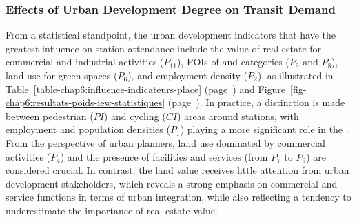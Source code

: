 \begin{refsegment}
\subsubsection*{Effects of Urban Development Degree on Transit Demand
    \label{chap6:results-influence-indicateurs-place}
    }

From a statistical standpoint, the urban development indicators that have the greatest influence on station attendance include the value of real estate for commercial and industrial activities (\(P_{11}\)), \acrshort{POIs} of  and  categories (\(P_{9}\) and \(P_{8}\)), land use for green spaces (\(P_{6}\)), and employment density (\(P_{2}\)), as illustrated in \hyperref[table-chap6:influence-indicateurs-place]{Table~\ref{table-chap6:influence-indicateurs-place}} (page~\pageref{table-chap6:influence-indicateurs-place}) and \hyperref[fig-chap6:resultats-poids-iew-statistiques]{Figure~\ref{fig-chap6:resultats-poids-iew-statistiques}} (page~\pageref{fig-chap6:resultats-poids-iew-statistiques}). In practice, a distinction is made between pedestrian (\(PI\)) and cycling (\(CI\)) areas around stations, with employment and population densities (\(P_{1}\)) playing a more significant role in the . From the perspective of urban planners, land use dominated by commercial activities (\(P_{4}\)) and the presence of facilities and services (from \(P_{7}\) to \(P_{9}\)) are considered crucial. In contrast, the land value receives little attention from urban development stakeholders, which reveals a strong emphasis on commercial and service functions in terms of urban integration, while also reflecting a tendency to underestimate the importance of real estate value.%



\end{refsegment}
